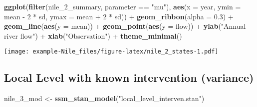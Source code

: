 \documentclass[]{book}
\newenvironment{Shaded}{\begin{snugshade}}{\end{snugshade}}
\newcommand{\KeywordTok}[1]{\textcolor[rgb]{0.13,0.29,0.53}{\textbf{{#1}}}}
\newcommand{\DataTypeTok}[1]{\textcolor[rgb]{0.13,0.29,0.53}{{#1}}}
\newcommand{\DecValTok}[1]{\textcolor[rgb]{0.00,0.00,0.81}{{#1}}}
\newcommand{\FloatTok}[1]{\textcolor[rgb]{0.00,0.00,0.81}{{#1}}}
\newcommand{\StringTok}[1]{\textcolor[rgb]{0.31,0.60,0.02}{{#1}}}
\newcommand{\NormalTok}[1]{{#1}}
\begin{document}
\begin{Shaded}
\end{Shaded}

\begin{Shaded}
\begin{Highlighting}[]
\KeywordTok{ggplot}\NormalTok{(}\KeywordTok{filter}\NormalTok{(nile_2_summary, parameter ==}\StringTok{ "mu"}\NormalTok{),}
       \KeywordTok{aes}\NormalTok{(}\DataTypeTok{x =} \NormalTok{year,}
           \DataTypeTok{ymin =} \NormalTok{mean -}\StringTok{ }\DecValTok{2} \NormalTok{*}\StringTok{ }\NormalTok{sd,}
           \DataTypeTok{ymax =} \NormalTok{mean +}\StringTok{ }\DecValTok{2} \NormalTok{*}\StringTok{ }\NormalTok{sd)) +}
\StringTok{  }\KeywordTok{geom_ribbon}\NormalTok{(}\DataTypeTok{alpha =} \FloatTok{0.3}\NormalTok{) +}
\StringTok{  }\KeywordTok{geom_line}\NormalTok{(}\KeywordTok{aes}\NormalTok{(}\DataTypeTok{y =} \NormalTok{mean)) +}
\StringTok{  }\KeywordTok{geom_point}\NormalTok{(}\KeywordTok{aes}\NormalTok{(}\DataTypeTok{y =} \NormalTok{flow)) +}
\StringTok{  }\KeywordTok{ylab}\NormalTok{(}\StringTok{"Annual river flow"}\NormalTok{) +}
\StringTok{  }\KeywordTok{xlab}\NormalTok{(}\StringTok{"Observation"}\NormalTok{) +}
\StringTok{  }\KeywordTok{theme_minimal}\NormalTok{()}
\end{Highlighting}
\end{Shaded}

\texttt{[image: example-Nile\_files/figure-latex/nile\_2\_states-1.pdf]}

\subsection{Local Level with known intervention
(variance)}\label{local-level-with-known-intervention-variance}

\begin{Shaded}
\begin{Highlighting}[]
\NormalTok{nile_3_mod <-}\StringTok{ }\KeywordTok{ssm_stan_model}\NormalTok{(}\StringTok{"local_level_interven.stan"}\NormalTok{)}
\end{Highlighting}
\end{Shaded}
\end{document}
